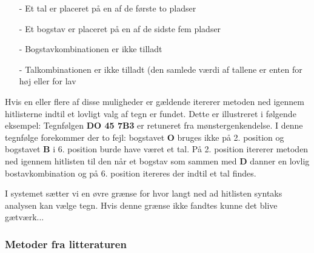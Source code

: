 \begin{itemize}
\item[-] Et tal er placeret på en af de første to pladser
\item[-] Et bogstav er placeret på en af de sidste fem pladser
\item[-] Bogstavkombinationen er ikke tilladt
\item[-] Talkombinationen er ikke tilladt (den samlede værdi af tallene er enten for høj eller for lav
\end{itemize}

Hvis en eller flere af disse muligheder er gældende itererer metoden ned igennem hitlisterne indtil et lovligt valg af tegn er fundet. Dette er illustreret i følgende eksempel: Tegnfølgen \textbf{DO 45 7B3} er retuneret fra mønstergenkendelse. I denne tegnfølge forekommer der to fejl: bogstavet \textbf{O} bruges ikke på 2. position og bogstavet \textbf{B} i 6. position burde have været et tal. På 2. position itererer metoden ned igennem hitlisten til den når et bogstav som sammen med \textbf{D} danner en lovlig bostavkombination og på 6. position itereres der indtil et tal findes.

I systemet sætter vi en øvre grænse for hvor langt ned ad hitlisten syntaks analysen kan vælge tegn. Hvis denne grænse ikke fandtes kunne det blive gætværk...

\subsubsection{Metoder fra litteraturen}
